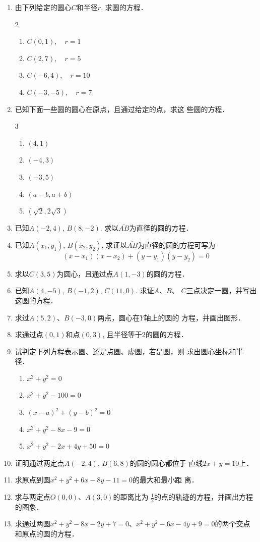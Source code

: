 \begin{ex}
\begin{enumerate}
    \item 由下列给定的圆心$C$和半径$r$, 求圆的方程．
\begin{multicols}{2}
\begin{enumerate}
    \item $C(0,1),\quad r=1$
    \item $C(2,7),\quad r=5$
    \item $C(-6,4),\quad r=10$
    \item $C(-3,-5),\quad r=7$
\end{enumerate}
\end{multicols}
    \item 已知下面一些圆的圆心在原点，且通过给定的点，求这
    些圆的方程．
\begin{multicols}{3}
\begin{enumerate}
    \item $(4,1)$
    \item $(-4,3)$
    \item $(-3,5)$
    \item $(a-b,a+b)$
    \item $(\sqrt{2},2\sqrt{3})$
\end{enumerate}
\end{multicols}

\item 已知$A(-2,4)$, $B(8,-2)$. 求以$\overline{AB}$为直径的圆的方程．
\item 已知$A(x_1,y_1)$, $B(x_2,y_2)$. 求证以$\overline{AB}$为直径的圆的方程可写为
\[(x-x_1)(x-x_2)+(y-y_1)(y-y_2)=0\]
\item 求以$C(3,5)$为圆心，且通过点$A(1,-3)$的圆的方程．
\item 已知$A(4,-5)$, $B(-1,2)$, $C(11,0)$. 求证$A$、$B$、
$C$三点决定一圆，并写出这圆的方程．
\item 求过$A(5,2)$、$B(-3,0)$两点，圆心在$Y$轴上的圆的
方程，并画出图形．
\item 求通过点$(0,1)$和点$(0,3)$, 且半径等于2的圆的方程．
\item 试判定下列方程表示圆、还是点圆、虚圆，若是圆，则
求出圆心坐标和半径．
\begin{enumerate}
\item $x^2+y^2=0$
\item $x^2+y^2-100=0$
\item $(x-a)^2+(y-b)^2=0$
\item $x^2+y^2-8x-9=0$
\item $x^2+y^2-2x+4y+50=0$
\end{enumerate}

\item 证明通过两定点$A(-2,4)$, $B(6,8)$的圆的圆心都位于
直线$2x+y=10$上．
\item 求原点到圆$x^2+y^2+6x-8y-11=0$的最大和最小距
离．
\item 求与两定点$O(0,0)$、$A(3,0)$的距离比为
$\frac{1}{2}$的点的轨迹的方程，并画出方程的图象．
\item 求通过两圆$x^2+y^2-8x-2y+7=0$、$x^2+y^2-6x-
4y+9=0$的两个交点和原点的圆的方程．
\end{enumerate}
\end{ex}

